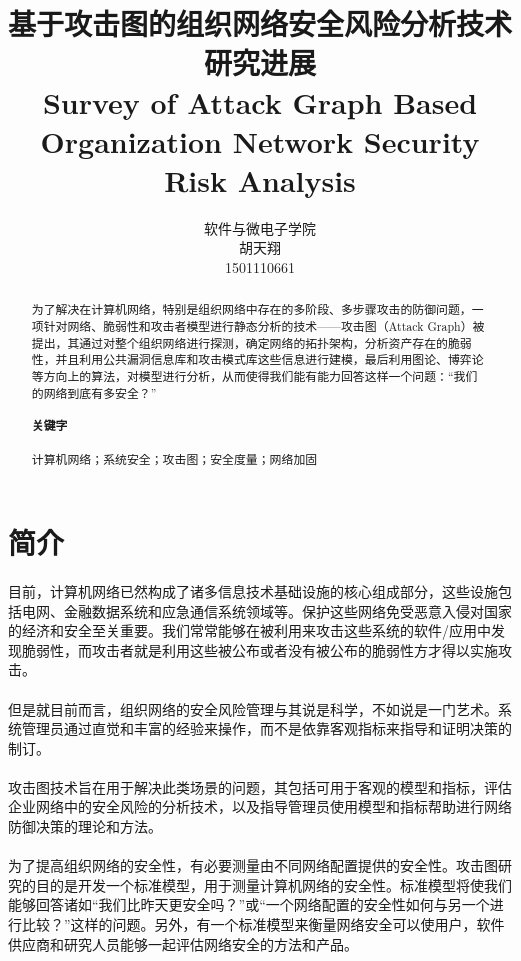 \documentclass[12pt,a4paper]{article}
\title{基于攻击图的组织网络安全风险分析技术研究进展\\Survey of Attack Graph Based Organization Network Security Risk Analysis}
\author{软件与微电子学院\\胡天翔\\1501110661}
\begin{document}
\maketitle

\renewcommand{\figurename}{图}
\renewcommand{\abstractname}{摘要} 
\begin{abstract}
\setlength{\parindent}{0pt} \setlength{\parskip}{1.5ex plus 0.5ex minus 0.2ex} %
为了解决在计算机网络，特别是组织网络中存在的多阶段、多步骤攻击的防御问题，一项针对网络、脆弱性和攻击者模型进行静态分析的技术——攻击图（Attack Graph）被提出，其通过对整个组织网络进行探测，确定网络的拓扑架构，分析资产存在的脆弱性，并且利用公共漏洞信息库和攻击模式库这些信息进行建模，最后利用图论、博弈论等方向上的算法，对模型进行分析，从而使得我们能有能力回答这样一个问题：“我们的网络到底有多安全？”
\paragraph{关键字}计算机网络；系统安全；攻击图；安全度量；网络加固
\end{abstract}

\section{简介}

\paragraph{}
目前，计算机网络已然构成了诸多信息技术基础设施的核心组成部分，这些设施包括电网、金融数据系统和应急通信系统领域等。保护这些网络免受恶意入侵对国家的经济和安全至关重要。我们常常能够在被利用来攻击这些系统的软件/应用中发现脆弱性，而攻击者就是利用这些被公布或者没有被公布的脆弱性方才得以实施攻击。
\paragraph{}
但是就目前而言，组织网络的安全风险管理与其说是科学，不如说是一门艺术。系统管理员通过直觉和丰富的经验来操作，而不是依靠客观指标来指导和证明决策的制订。
\paragraph{}
攻击图技术旨在用于解决此类场景的问题，其包括可用于客观的模型和指标，评估企业网络中的安全风险的分析技术，以及指导管理员使用模型和指标帮助进行网络防御决策的理论和方法。
\paragraph{}
为了提高组织网络的安全性，有必要测量由不同网络配置提供的安全性。攻击图研究的目的是开发一个标准模型，用于测量计算机网络的安全性。标准模型将使我们能够回答诸如“我们比昨天更安全吗？”或“一个网络配置的安全性如何与另一个进行比较？”这样的问题。另外，有一个标准模型来衡量网络安全可以使用户，软件供应商和研究人员能够一起评估网络安全的方法和产品。
\end{document}
